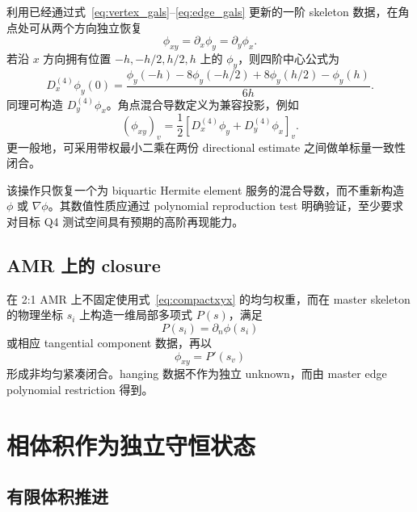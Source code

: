 \documentclass[11pt,a4paper]{ctexart}
\newcommand{\grad}{\nabla}
\begin{document}
利用已经通过式~\eqref{eq:vertex_gals}--\eqref{eq:edge_gals} 更新的一阶 skeleton 数据，在角点处可从两个方向独立恢复
\begin{equation}
    \phi_{xy}=\partial_x\phi_y=\partial_y\phi_x.
\end{equation}
若沿 $x$ 方向拥有位置 $-h,-h/2,h/2,h$ 上的 $\phi_y$，则四阶中心公式为
\begin{equation}
    D_x^{(4)}\phi_y(0)
    =\frac{
    \phi_y(-h)-8\phi_y(-h/2)+8\phi_y(h/2)-\phi_y(h)
    }{6h}.
    \label{eq:compactxyx}
\end{equation}
同理可构造 $D_y^{(4)}\phi_x$。角点混合导数定义为兼容投影，例如
\begin{equation}
    \boxed{
    (\phi_{xy})_v
    =\frac12\left[
    D_x^{(4)}\phi_y+D_y^{(4)}\phi_x
    \right]_v.
    }
    \label{eq:xyclosure}
\end{equation}
更一般地，可采用带权最小二乘在两份 directional estimate 之间做单标量一致性闭合。

该操作只恢复一个为 biquartic Hermite element 服务的混合导数，而不重新构造 $\phi$ 或 $\grad\phi$。其数值性质应通过 polynomial reproduction test 明确验证，至少要求对目标 Q4 测试空间具有预期的高阶再现能力。

\subsection{AMR 上的 closure}

在 2:1 AMR 上不固定使用式~\eqref{eq:compactxyx} 的均匀权重，而在 master skeleton 的物理坐标 $s_i$ 上构造一维局部多项式 $P(s)$，满足
\begin{equation}
    P(s_i)=\partial_n\phi(s_i)
\end{equation}
或相应 tangential component 数据，再以
\begin{equation}
    \phi_{xy}=P'(s_v)
\end{equation}
形成非均匀紧凑闭合。hanging 数据不作为独立 unknown，而由 master edge polynomial restriction 得到。

\section{相体积作为独立守恒状态}

\subsection{有限体积推进}
\end{document}
